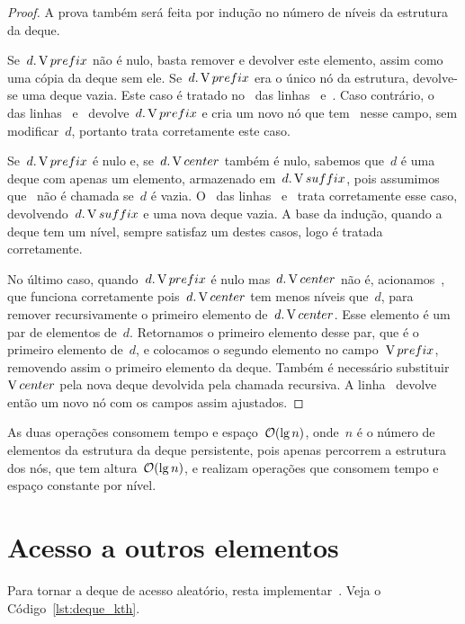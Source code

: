 \documentclass[main.tex]{subfiles}
\begin{document}
\begin{proof}
A prova também será feita por indução no número de níveis da estrutura da deque.

    Se~$d.\operatorname{V}{prefix}$ não é nulo, basta remover e devolver este elemento, assim como uma cópia da deque sem ele. Se~$d.\operatorname{V}{prefix}$ era o único nó da estrutura, devolve-se uma deque vazia. Este caso é tratado no~ das linhas~ e~. Caso contrário, o~ das linhas~ e~ devolve~$d.\operatorname{V}{prefix}$ e cria um novo nó que tem~ nesse campo, sem modificar~$d$, portanto trata corretamente este caso.

Se~$d.\operatorname{V}{prefix}$ é nulo e, se~$d.\operatorname{V}{center}$ também é nulo, sabemos que~$d$ é uma deque com apenas um elemento, armazenado em~$d.\operatorname{V}{suffix}$, pois assumimos que~ não é chamada se~$d$ é vazia. O~ das linhas~ e~ trata corretamente esse caso, devolvendo~$d.\operatorname{V}{suffix}$ e uma nova deque vazia. A base da indução, quando a deque tem um nível, sempre satisfaz um destes casos, logo é tratada corretamente.

No último caso, quando~$d.\operatorname{V}{prefix}$ é nulo mas~$d.\operatorname{V}{center}$ não é, acionamos~, que funciona corretamente pois~$d.\operatorname{V}{center}$ tem menos níveis que~$d$, para remover recursivamente o primeiro elemento de~$d.\operatorname{V}{center}$. Esse elemento é um par de elementos de~$d$. Retornamos o primeiro elemento desse par, que é o primeiro elemento de~$d$, e colocamos o segundo elemento no campo~$\operatorname{V}{prefix}$, removendo assim o primeiro elemento da deque. Também é necessário substituir~$\operatorname{V}{center}$ pela nova deque devolvida pela chamada recursiva. A linha~ devolve então um novo nó com os campos assim ajustados.
\end{proof}

As duas operações consomem tempo e espaço~$\mathcal{O}(\lg n)$, onde~$n$ é o número de elementos da estrutura da deque persistente, pois apenas percorrem a estrutura dos nós, que tem altura~$\mathcal{O}(\lg n)$, e realizam operações que consomem tempo e espaço constante por nível.

\section{Acesso a outros elementos}

Para tornar a deque de acesso aleatório, resta implementar~. Veja o Código~\ref{lst:deque_kth}.
\end{document}
